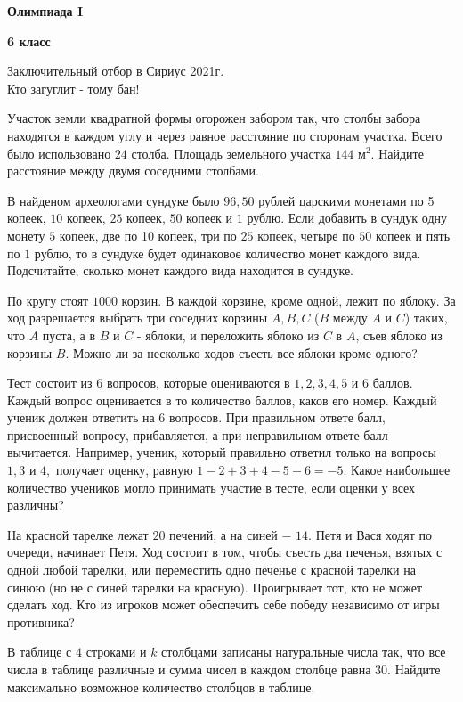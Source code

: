 \centerline{\Huge \bf  Олимпиада I}
\centerline{\Huge \bf 6 класс}

\begin{flushright}
    \scriptsize{Заключительный отбор в Сириус 2021г.\\ Кто загуглит - тому бан!}
\end{flushright}

Участок земли квадратной формы огорожен забором так, что столбы забора находятся в каждом углу и через равное расстояние по сторонам участка. Всего было использовано $24$ столба. Площадь земельного участка $144$ м$^{2}$. Найдите расстояние между двумя соседними столбами.

В найденом археологами сундуке было $96,50$ рублей царскими монетами по 5 копеек, $10$ копеек, $25$ копеек, $50$ копеек и $1$ рублю. Если добавить в сундук одну монету $5$ копеек, две по 10 копеек, три по $25$ копеек, четыре по $50$ копеек и пять по $1$ рублю, то в сундуке будет одинаковое количество монет каждого вида. Подсчитайте, сколько монет каждого вида находится в сундуке.

По кругу стоят $1000$ корзин. В каждой корзине, кроме одной, лежит по яблоку. За ход разрешается выбрать три соседних корзины $A, B, C$ ($B$ между $A$ и $C$) таких, что $A$ пуста, а в $B$ и $C$ - яблоки, и переложить яблоко из $C$ в $A$, съев яблоко из корзины $B$. Можно ли за несколько ходов съесть все яблоки кроме одного?

Тест состоит из 6 вопросов, которые оцениваются в $1, 2, 3, 4, 5$ и $6$ баллов. Каждый вопрос оценивается в то количество баллов, каков его номер. Каждый ученик должен ответить на $6$ вопросов. При правильном ответе балл, присвоенный вопросу, прибавляется, а при неправильном ответе балл вычитается. Например, ученик, который правильно ответил только на вопросы $1, 3$ и $4,$ получает оценку, равную $1-2+3+4-5-6 = -5.$ Какое наибольшее количество учеников могло принимать участие в тесте, если оценки у всех различны?

На красной тарелке лежат $20$ печений, а на синей $-$ $14$. Петя и Вася ходят по очереди, начинает Петя. Ход состоит в том, чтобы съесть два печенья, взятых с одной любой тарелки, или переместить одно печенье с красной тарелки на синюю (но не с синей тарелки на красную). Проигрывает тот, кто не может сделать ход. Кто из игроков может обеспечить себе победу независимо от игры противника?

В таблице с $4$ строками и $k$ столбцами записаны натуральные числа так, что все числа в таблице различные и сумма чисел в каждом столбце равна $30$. Найдите максимально возможное количество столбцов в таблице.